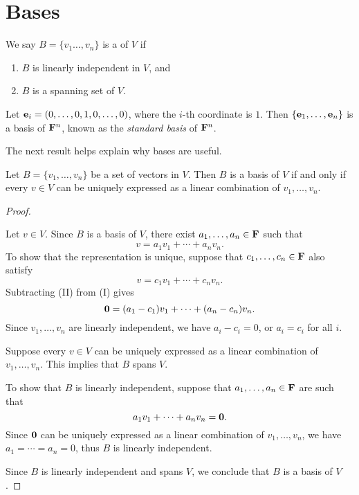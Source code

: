 \section{Bases}
\begin{definition}[Basis]
We say $B=\{v_1\dots,v_n\}$ is a  of $V$ if
\begin{enumerate}[label=(\roman*)]
\item $B$ is linearly independent in $V$, and
\item $B$ is a spanning set of $V$.
\end{enumerate}
\end{definition}

\begin{example}
Let $\vb{e}_i=(0,\dots,0,1,0,\dots,0)$, where the $i$-th coordinate is $1$. Then $\{\vb{e}_1,\dots,\vb{e}_n\}$ is a basis of $\mathbf F^n$, known as the \emph{standard basis} of $\mathbf F^n$.
\end{example}

The next result helps explain why bases are useful.

\begin{lemma}\label{lemma:basis-criterion}
Let $B=\{v_1,\dots,v_n\}$ be a set of vectors in $V$. Then $B$ is a basis of $V$ if and only if every $v\in V$ can be uniquely expressed as a linear combination of $v_1,\dots,v_n$.
\end{lemma}

\begin{proof} \

\fbox{$\implies$} Let $v\in V$. Since $B$ is a basis of $V$, there exist $a_1,\dots,a_n\in\mathbf F$ such that
\begin{equation*}\tag{I}
v=a_1v_1+\cdots+a_nv_n.
\end{equation*}
To show that the representation is unique, suppose that $c_1,\dots,c_n\in\mathbf F$ also satisfy
\begin{equation*}\tag{II}
v=c_1v_1+\cdots+c_nv_n.
\end{equation*}
Subtracting (II) from (I) gives
\[\vb{0}=(a_1-c_1)v_1+\cdots+(a_n-c_n)v_n.\]
Since $v_1,\dots,v_n$ are linearly independent, we have $a_i-c_i=0$, or $a_i=c_i$ for all $i$.

\fbox{$\impliedby$} Suppose every $v\in V$ can be uniquely expressed as a linear combination of $v_1,\dots,v_n$. This implies that $B$ spans $V$. 

To show that $B$ is linearly independent, suppose that $a_1,\dots,a_n\in\mathbf F$ are such that
\[a_1v_1+\cdots+a_nv_n=\vb{0}.\]
Since $\vb{0}$ can be uniquely expressed as a linear combination of $v_1,\dots,v_n$, we have $a_1=\cdots=a_n=0$, thus $B$ is linearly independent. 

Since $B$ is linearly independent and spans $V$, we conclude that $B$ is a basis of $V$.
\end{proof}

